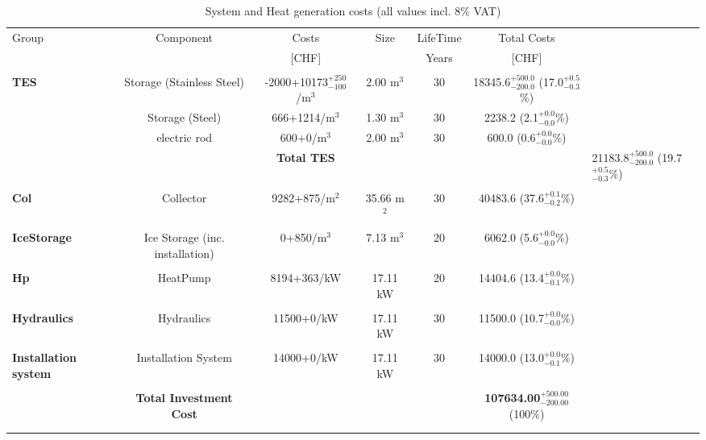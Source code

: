 \documentclass[english]{SPFShortReport}
\begin{document}
\begin{table}[!ht]
\centering
\caption{System and Heat generation costs (all values incl. 8$\%$ VAT) }
\begin{adjustbox}{max width =\textwidth}
\begin{tabular}{l | c c c c c } 
\hline
\hline
Group &Component &Costs &Size &LifeTime &Total Costs \\ 
 & &[CHF] & &Years &[CHF]\\ 
\hline
\\
\textbf{TES} & Storage (Stainless Steel) & -2000+10173$^{\mathrm{+250}}_{\mathrm{-100}}$/m$^3$ & 2.00 m$^3$ & 30 & 18345.6$^{\mathrm{+500.0}}_{\mathrm{-200.0}}$ (17.0$^{\mathrm{+0.5}}_{\mathrm{-0.3}}$\%) \\
 & Storage (Steel) & 666+1214/m$^3$ & 1.30 m$^3$ & 30 & 2238.2 (2.1$^{\mathrm{+0.0}}_{\mathrm{-0.0}}$\%) \\
 & electric rod & 600+0/m$^3$ & 2.00 m$^3$ & 30 & 600.0 (0.6$^{\mathrm{+0.0}}_{\mathrm{-0.0}}$\%) \\
&
 & \textbf{Total TES} & & & & 21183.8$^{\mathrm{+500.0}}_{\mathrm{-200.0}}$ (19.7$^{\mathrm{+0.5}}_{\mathrm{-0.3}}$\%) \\
\hline \\
\textbf{Col} & Collector & 9282+875/m$^2$ & 35.66 m$^2$ & 30 & 40483.6 (37.6$^{\mathrm{+0.1}}_{\mathrm{-0.2}}$\%) \\
\hline \\
\textbf{IceStorage} & Ice Storage (inc. installation) & 0+850/m$^3$ & 7.13 m$^3$ & 20 & 6062.0 (5.6$^{\mathrm{+0.0}}_{\mathrm{-0.0}}$\%) \\
\hline \\
\textbf{Hp} & HeatPump & 8194+363/kW & 17.11 kW & 20 & 14404.6 (13.4$^{\mathrm{+0.0}}_{\mathrm{-0.1}}$\%) \\
\hline \\
\textbf{Hydraulics} & Hydraulics & 11500+0/kW & 17.11 kW & 30 & 11500.0 (10.7$^{\mathrm{+0.0}}_{\mathrm{-0.0}}$\%) \\
\hline \\
\textbf{Installation system} & Installation System & 14000+0/kW & 17.11 kW & 30 & 14000.0 (13.0$^{\mathrm{+0.0}}_{\mathrm{-0.1}}$\%) \\
\hline \\
 & \textbf{Total Investment Cost} & & & & \textbf{107634.00$^{\mathrm{+500.00}}_{\mathrm{-200.00}}$} (100\%) \\ 
\hline \\ 
\hline \\ 

\end{tabular}
\end{adjustbox}
\end{table}
\end{document}
